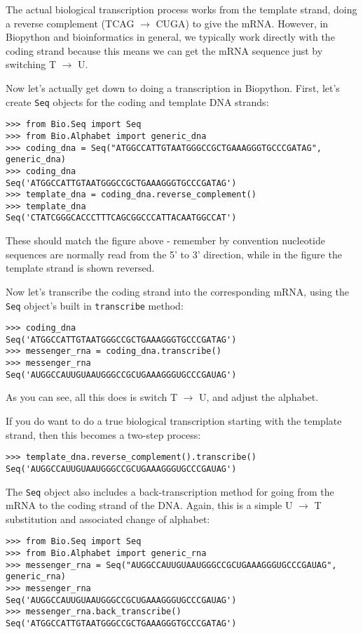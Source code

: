 The actual biological transcription process works from the template strand, doing a reverse complement (TCAG $\rightarrow$ CUGA) to give the mRNA.  However, in Biopython and bioinformatics in general, we typically work directly with the coding strand because this means we can get the mRNA sequence just by switching T $\rightarrow$ U.

Now let's actually get down to doing a transcription in Biopython.  First, let's create \verb|Seq| objects for the coding and template DNA strands:

\begin{verbatim}
>>> from Bio.Seq import Seq
>>> from Bio.Alphabet import generic_dna
>>> coding_dna = Seq("ATGGCCATTGTAATGGGCCGCTGAAAGGGTGCCCGATAG", generic_dna)
>>> coding_dna
Seq('ATGGCCATTGTAATGGGCCGCTGAAAGGGTGCCCGATAG')
>>> template_dna = coding_dna.reverse_complement()
>>> template_dna
Seq('CTATCGGGCACCCTTTCAGCGGCCCATTACAATGGCCAT')
\end{verbatim}
\noindent These should match the figure above - remember by convention nucleotide sequences are normally read from the 5' to 3' direction, while in the figure the template strand is shown reversed.

Now let's transcribe the coding strand into the corresponding mRNA, using the \verb|Seq| object's built in \verb|transcribe| method:

\begin{verbatim}
>>> coding_dna
Seq('ATGGCCATTGTAATGGGCCGCTGAAAGGGTGCCCGATAG')
>>> messenger_rna = coding_dna.transcribe()
>>> messenger_rna
Seq('AUGGCCAUUGUAAUGGGCCGCUGAAAGGGUGCCCGAUAG')
\end{verbatim}
\noindent As you can see, all this does is switch T $\rightarrow$ U, and adjust the alphabet.

If you do want to do a true biological transcription starting with the template strand, then this becomes a two-step process:

\begin{verbatim}
>>> template_dna.reverse_complement().transcribe()
Seq('AUGGCCAUUGUAAUGGGCCGCUGAAAGGGUGCCCGAUAG')
\end{verbatim}

The \verb|Seq| object also includes a back-transcription method for going from the mRNA to the coding strand of the DNA.  Again, this is a simple U $\rightarrow$ T substitution and associated change of alphabet:

\begin{verbatim}
>>> from Bio.Seq import Seq
>>> from Bio.Alphabet import generic_rna
>>> messenger_rna = Seq("AUGGCCAUUGUAAUGGGCCGCUGAAAGGGUGCCCGAUAG", generic_rna)
>>> messenger_rna
Seq('AUGGCCAUUGUAAUGGGCCGCUGAAAGGGUGCCCGAUAG')
>>> messenger_rna.back_transcribe()
Seq('ATGGCCATTGTAATGGGCCGCTGAAAGGGTGCCCGATAG')
\end{verbatim}

